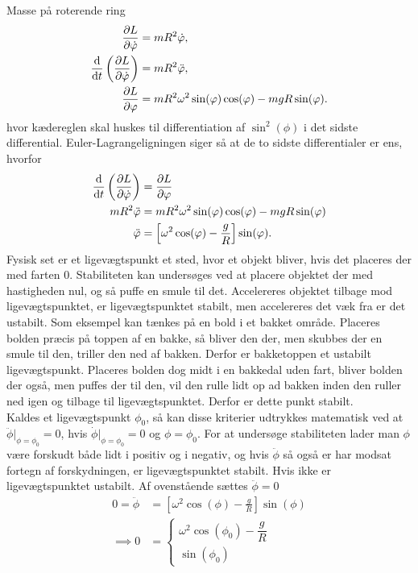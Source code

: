 \documentclass[crop=false, class=memoir]{standalone}
\begin{document}
\begin{opgave}[3]{Masse på roterende ring}
\begin{align*}
	\pdv{L}{\dot{\varphi}} &= mR^2\dot{\varphi}, \\
	\dv{}{t}\left(\pdv{L}{\dot{\varphi}}\right) &= mR^2\ddot{\varphi}, \\
	\pdv{L}{\varphi} &= mR^2\omega^2\sin(\varphi)\cos(\varphi) - mgR\sin(\varphi).
\end{align*}
%
hvor kædereglen skal huskes til differentiation af $\sin^2(\phi)$ i det sidste differential. Euler-Lagrangeligningen siger så at de to sidste differentialer er ens, hvorfor
%
\begin{align} \label{mek:eq:BeadOnHoopEOM}
	\begin{aligned}
		\dv{}{t}\left(\pdv{L}{\dot{\varphi}}\right) &= \pdv{L}{\varphi} \\
		mR^2\ddot{\varphi} &= mR^2\omega^2\sin(\varphi)\cos(\varphi) - mgR\sin(\varphi) \\
		\ddot{\varphi} &= \left[\omega^2\cos(\varphi) - \frac{g}{R}\right]\sin(\varphi).
    \end{aligned}
\end{align}
%
\opg Fysisk set er et ligevægtspunkt et sted, hvor et objekt bliver, hvis det placeres der med farten $0$. Stabiliteten kan undersøges ved at placere objektet der med hastigheden nul, og så puffe en smule til det. Accelereres objektet tilbage mod ligevægtspunktet, er ligevægtspunktet stabilt, men accelereres det væk fra er det ustabilt. Som eksempel kan tænkes på en bold i et bakket område. Placeres bolden præcis på toppen af en bakke, så bliver den der, men skubbes der en smule til den, triller den ned af bakken. Derfor er bakketoppen et ustabilt ligevægtspunkt. Placeres bolden dog midt i en bakkedal uden fart, bliver bolden der også, men puffes der til den, vil den rulle lidt op ad bakken inden den ruller ned igen og tilbage til ligevægtspunktet. Derfor er dette punkt stabilt. \\
Kaldes et ligevægtspunkt $\phi_0$, så kan disse kriterier udtrykkes matematisk ved at $\ddot{\phi}|_{\phi=\phi_0} = 0$, hvis $\dot{\phi}|_{\phi=\phi_0} = 0$ og $\phi = \phi_0$. For at undersøge stabiliteten lader man $\phi$ være forskudt både lidt i positiv og i negativ, og hvis $\ddot{\phi}$ så også er har modsat fortegn af forskydningen, er ligevægtspunktet stabilt. Hvis ikke er ligevægtspunktet ustabilt.
%
\opg Af ovenstående sættes $\ddot{\phi} = 0$
%
\begin{align*}
	0 = \ddot{\phi} &= \left[\omega^2\cos(\phi) - \frac{g}{R}\right]\sin(\phi) \\
	\implies 0 &= \begin{cases} \omega^2\cos(\phi_0) - \dfrac{g}{R} \\[1mm]
	\sin(\phi_0) \end{cases} \\

\end{align*}
\end{opgave}
\end{document}
